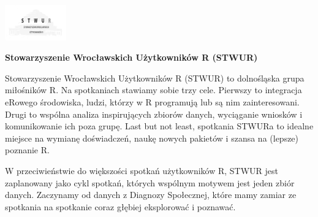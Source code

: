\documentclass[\main/boa.tex]{subfiles}
\begin{document}
	
	\begin{minipage}[t]{0.915\textwidth}
		\center     
		\includegraphics[width=100px]{img/logos.bw/stwur.png} 
	\end{minipage}
	\begin{center}
	\Large \textbf {Stowarzyszenie Wrocławskich Użytkowników R (STWUR)}
	\end{center}
	
	\vskip 0.3cm
	\normalsize 
	Stowarzyszenie Wrocławskich Użytkowników R (STWUR) to dolnośląska grupa miłośników R. Na spotkaniach stawiamy sobie trzy cele. Pierwszy to integracja eRowego środowiska, ludzi, którzy w R programują lub są nim zainteresowani. Drugi to wspólna analiza inspirujących zbiorów danych, wyciąganie wniosków i komunikowanie ich poza grupę. Last but not least, spotkania STWURa to idealne miejsce na wymianę doświadczeń, naukę nowych pakietów i szansa na (lepsze) poznanie R.
	
	W przeciwieństwie do większości spotkań użytkowników R, STWUR jest zaplanowany jako cykl spotkań, których wspólnym motywem jest jeden zbiór danych. Zaczynamy od danych z Diagnozy Społecznej, które mamy zamiar ze spotkania na spotkanie coraz głębiej eksplorować i poznawać.
	
	\vskip 1.5cm
\end{document}

